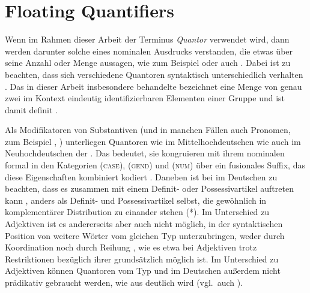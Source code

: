 

\section{Floating Quantifiers}
\label{sec:floatquant}

Wenn im Rahmen dieser Arbeit der Terminus \textit{Quantor} verwendet wird, dann
werden darunter solche  eines nominalen Ausdrucks
verstanden, die etwas über seine Anzahl oder Menge aussagen, wie zum Beispiel
 oder auch . Dabei ist zu beachten, dass
sich verschiedene Quantoren syntaktisch unterschiedlich verhalten
\autocites[27--28]{pittner1995}[11--12]{haspelmath1997}. Das in dieser Arbeit
insbesondere behandelte  bezeichnet eine Menge von genau
zwei im Kontext eindeutig identifizierbaren Elementen einer Gruppe
\autocite[vgl.][307]{keenan2006} und ist damit definit
\autocite[265--268]{lyons1999}.

Als Modifikatoren von Substantiven (und in
manchen Fällen auch Pronomen, zum Beispiel , )
unterliegen Quantoren wie  im
Mittelhochdeutschen wie auch  im
Neuhochdeutschen der . Das
bedeutet, sie kongruieren mit ihrem nominalen 
formal in den Kategorien  (\textsc{case}),
 (\textsc{gend}) und  (\textsc{num}) über ein
fusionales Suffix, das diese Eigenschaften kombiniert kodiert
\autocites(vgl.~auch ,
)[181--184]{ksw2}[772]{woellstein2022}. Daneben ist bei
 im Deutschen zu beachten, dass es zusammen mit
einem Definit- oder Possessivartikel auftreten kann
, anders als Definit- und Possessivartikel selbst, die
gewöhnlich in komplementärer Distribution zu
einander stehen (*). Im Unterschied zu
Adjektiven ist es andererseits aber auch nicht möglich,
in der syntaktischen Position von 
weitere Wörter vom gleichen Typ unterzubringen, weder durch Koordination
 noch durch Reihung , wie es etwa bei
Adjektiven trotz Restriktionen bezüglich ihrer  grundsätzlich
möglich ist. Im Unterschied zu Adjektiven können Quantoren vom Typ
 und  im Deutschen außerdem nicht
prädikativ gebraucht werden, wie aus  deutlich wird
(vgl.~auch \cite[181, Fußnote~1]{merchant1996}).

